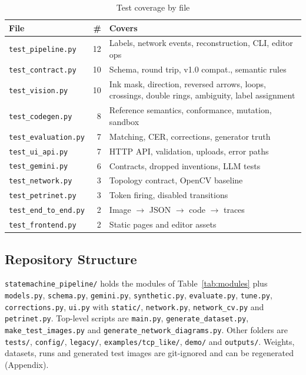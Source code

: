 \documentclass[journal,10pt]{IEEEtran}
\newcommand{\code}[1]{\texttt{#1}}
\begin{document}
\begin{table}[t]
\centering
\caption{Test coverage by file}
\label{tab:tests}
\footnotesize
\begin{tabular}{@{}lrL{4.4cm}@{}}
\toprule
\textbf{File} & \textbf{\#} & \textbf{Covers} \\
\midrule
\code{test\_pipeline.py} & 12 & Labels, network events, reconstruction, CLI, editor ops \\
\code{test\_contract.py} & 10 & Schema, round trip, v1.0 compat., semantic rules \\
\code{test\_vision.py} & 10 & Ink mask, direction, reversed arrows, loops, crossings,
double rings, ambiguity, label assignment \\
\code{test\_codegen.py} & 8 & Reference semantics, conformance, mutation, sandbox \\
\code{test\_evaluation.py} & 7 & Matching, CER, corrections, generator truth \\
\code{test\_ui\_api.py} & 7 & HTTP API, validation, uploads, error paths \\
\code{test\_gemini.py} & 6 & Contracts, dropped inventions, LLM tests \\
\code{test\_network.py} & 3 & Topology contract, OpenCV baseline \\
\code{test\_petrinet.py} & 3 & Token firing, disabled transitions \\
\code{test\_end\_to\_end.py} & 2 & Image $\rightarrow$ JSON $\rightarrow$ code
$\rightarrow$ traces \\
\code{test\_frontend.py} & 2 & Static pages and editor assets \\
\bottomrule
\end{tabular}
\end{table}

\subsection{Repository Structure}
\code{statemachine\_pipeline/} holds the modules of Table~\ref{tab:modules} plus
\code{models.py}, \code{schema.py}, \code{gemini.py}, \code{synthetic.py},
\code{evaluate.py}, \code{tune.py}, \code{corrections.py}, \code{ui.py} with
\code{static/}, \code{network.py}, \code{network\_cv.py} and \code{petrinet.py}.
Top-level scripts are \code{main.py}, \code{generate\_dataset.py},
\code{make\_test\_images.py} and \code{generate\_network\_diagrams.py}. Other folders are
\code{tests/}, \code{config/}, \code{legacy/}, \code{examples/tcp\_like/}, \code{demo/} and
\code{outputs/}. Weights, datasets, runs and generated test images are git-ignored and can
be regenerated (Appendix).
\end{document}
